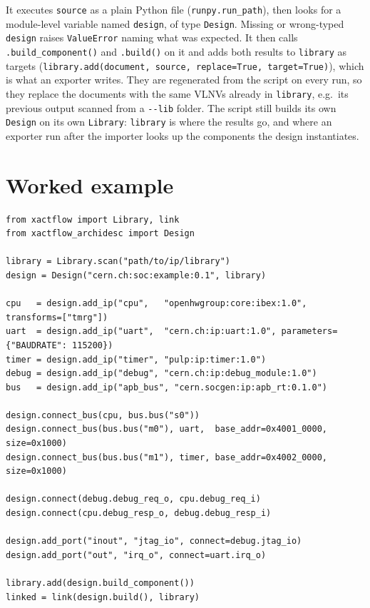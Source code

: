 \documentclass[11pt]{article}
\newcommand{\code}[1]{\texttt{#1}}
\begin{document}
It executes \code{source} as a plain Python file (\code{runpy.run\_path}), then looks for
a module-level variable named \code{design}, of type \code{Design}. Missing or
wrong-typed \code{design} raises \code{ValueError} naming what was expected. It then
calls \code{.build\_component()} and \code{.build()} on it and adds both results to
\code{library} as targets (\code{library.add(document, source, replace=True,
target=True)}), which is what an exporter writes. They are regenerated from the script on
every run, so they replace the documents with the same VLNVs already in \code{library},
e.g.\ its previous output scanned from a \code{-{}-lib} folder. The script still builds
its own \code{Design} on its own \code{Library}: \code{library} is where the results go,
and where an exporter run after the importer looks up the components the design
instantiates.

\section{Worked example}

\begin{lstlisting}[style=pyblock, caption={A complete design description, linked in the same script.}]
from xactflow import Library, link
from xactflow_archidesc import Design

library = Library.scan("path/to/ip/library")
design = Design("cern.ch:soc:example:0.1", library)

cpu   = design.add_ip("cpu",   "openhwgroup:core:ibex:1.0", transforms=["tmrg"])
uart  = design.add_ip("uart",  "cern.ch:ip:uart:1.0", parameters={"BAUDRATE": 115200})
timer = design.add_ip("timer", "pulp:ip:timer:1.0")
debug = design.add_ip("debug", "cern.ch:ip:debug_module:1.0")
bus   = design.add_ip("apb_bus", "cern.socgen:ip:apb_rt:0.1.0")

design.connect_bus(cpu, bus.bus("s0"))
design.connect_bus(bus.bus("m0"), uart,  base_addr=0x4001_0000, size=0x1000)
design.connect_bus(bus.bus("m1"), timer, base_addr=0x4002_0000, size=0x1000)

design.connect(debug.debug_req_o, cpu.debug_req_i)
design.connect(cpu.debug_resp_o, debug.debug_resp_i)

design.add_port("inout", "jtag_io", connect=debug.jtag_io)
design.add_port("out", "irq_o", connect=uart.irq_o)

library.add(design.build_component())
linked = link(design.build(), library)
\end{lstlisting}
\end{document}
